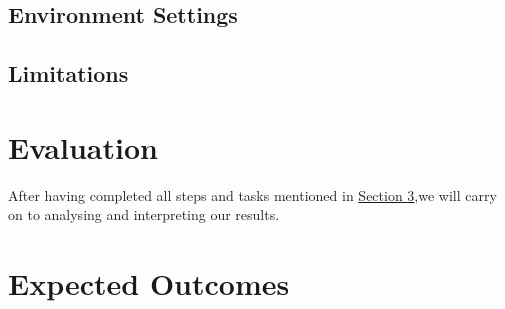 \documentclass[a4paper,11pt]{article}
\begin{document}
\subsection{Environment Settings}

\subsection{Limitations} \label{limitations}


\section{Evaluation} \label{evaluation}

After having completed all steps and tasks mentioned in \hyperref[methodology]{Section 3},we will carry on to analysing and interpreting our results.




\section{Expected Outcomes} \label{outcomes}
\end{document}
